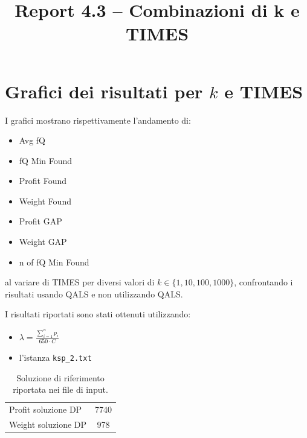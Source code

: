 \documentclass[a4paper,12pt]{article}
\title{Report 4.3 -- Combinazioni di k e TIMES}
\author{}
\begin{document}
\maketitle

\newpage

\section{Grafici dei risultati per $k$ e TIMES}

I grafici mostrano rispettivamente l'andamento di:
\begin{itemize}
    \item Avg fQ
    \item fQ Min Found
    \item Profit Found
    \item Weight Found
    \item Profit GAP
    \item Weight GAP
    \item n of fQ Min Found
\end{itemize}
al variare di TIMES per diversi valori di $k \in \{1,10,100,1000\}$, confrontando
i risultati usando QALS e non utilizzando QALS.

I risultati riportati sono stati ottenuti utilizzando:

\begin{itemize}
    \item $\lambda = \frac{\sum_{i=1}^{n} p_i}{650 \cdot C}$
    \item l'istanza \texttt{ksp\_2.txt}
\end{itemize}

\begin{table}[H]
\centering
\begin{tabular}{lc}
\hline
Profit soluzione DP & 7740 \\
Weight soluzione DP & 978 \\
\hline
\end{tabular}
\caption{Soluzione di riferimento riportata nei file di input.}
\label{tab:knapsack-solution}
\end{table}
\end{document}
